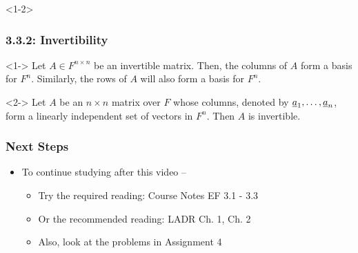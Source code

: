 \documentclass[10pt,english,aspectratio=169]{beamer}
\begin{document}
\begin{frame}<1-2> \frametitle{3.3.2: Invertibility}

\begin{lemma}<1->
Let $A\in F^{n \times n}$ be an invertible matrix.
Then, the columns of $A$ form a basis for $F^n$.
Similarly, the rows of $A$ will also form a basis for $F^n$.
\end{lemma}


\vspace{3mm}

\begin{theorem}<2->
Let $A$ be an $n \times n$ matrix over $F$ whose columns, denoted by $\underline{a}_1, \ldots, \underline{a}_n$, form a linearly independent set of vectors in $F^{n}$.
Then $A$ is invertible.
\end{theorem}



\end{frame}


\begin{frame} \frametitle{Next Steps}

\begin{itemize}
\setlength\itemsep{5mm}
\item To continue studying after this video -- \vspace{2mm}

\begin{itemize}
 \setlength\itemsep{3mm}
 \item Try the required reading: Course Notes EF 3.1 - 3.3
 \item Or the recommended reading: LADR Ch. 1, Ch. 2
 \item Also, look at the problems in Assignment 4
\end{itemize}
\end{itemize}


\end{frame}
\end{document}
